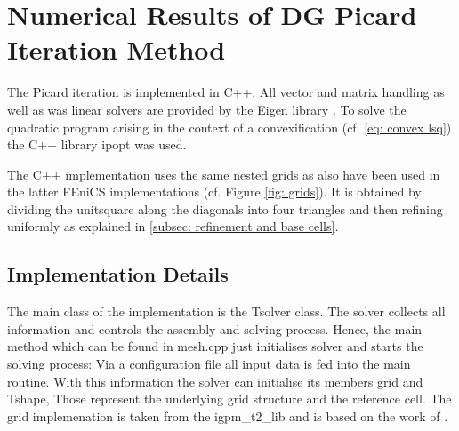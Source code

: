 \newpage

\section{Numerical Results of DG Picard Iteration Method}

The Picard iteration is implemented in C++. All vector and matrix handling as well as was linear solvers are provided by the Eigen library \cite{eigenweb}. To solve the quadratic program arising in the context of a convexification (cf. \eqref{eq: convex lsq}) the C++ library ipopt \cite{ipopt} was used.

The C++ implementation uses the same nested grids as also have been used in the latter FEniCS implementations (cf. Figure \ref{fig: grids}). It is obtained by dividing the unitsquare along the diagonals into four triangles and then refining uniformly as explained in \ref{subsec: refinement and base cells}.

\subsection{Implementation Details}

The main class of the implementation is the Tsolver class. The solver collects all information and controls the assembly and solving process.
Hence, the main method which can be found in mesh.cpp just initialises solver and starts the solving process: Via a configuration file all input data is fed into the main routine. With this information the solver can initialise its members grid and Tshape, Those represent the underlying grid structure and the reference cell. 
The grid implemenation is taken from the igpm\_t2\_lib and is based on the work of \cite{BMV2009}.

